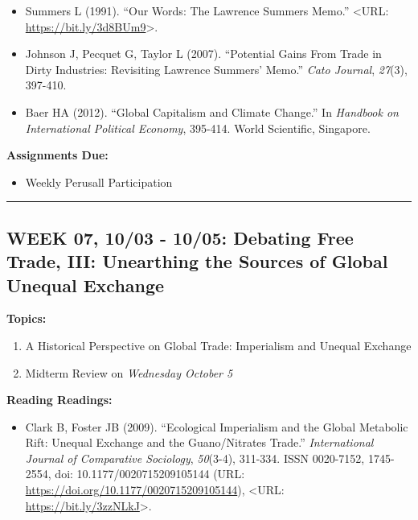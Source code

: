 \documentclass[11pt,]{article}
\providecommand{\tightlist}{%
  \setlength{\itemsep}{0pt}\setlength{\parskip}{0pt}}
\begin{document}
\begin{itemize}
\item
  Summers L (1991). ``Our Words: The Lawrence Summers Memo.''
  \textless URL: \url{https://bit.ly/3d8BUm9}\textgreater.
\item
  Johnson J, Pecquet G, Taylor L (2007). ``Potential Gains From Trade in
  Dirty Industries: Revisiting Lawrence Summers' Memo.'' \emph{Cato
  Journal}, \emph{27}(3), 397-410.
\item
  Baer HA (2012). ``Global Capitalism and Climate Change.'' In
  \emph{Handbook on International Political Economy}, 395-414. World
  Scientific, Singapore.
\end{itemize}

\textbf{Assignments Due:}

\begin{itemize}
\tightlist
\item
  Weekly Perusall Participation
\end{itemize}

\bigbreak
\hrule

\hypertarget{week-07-1003---1005-debating-free-trade-iii-unearthing-the-sources-of-global-unequal-exchange}{%
\subsection{WEEK 07, 10/03 - 10/05: Debating Free Trade, III: Unearthing
the Sources of Global Unequal
Exchange}\label{week-07-1003---1005-debating-free-trade-iii-unearthing-the-sources-of-global-unequal-exchange}}

\textbf{Topics:}

\begin{enumerate}
\def\labelenumi{(\arabic{enumi})}
\tightlist
\item
  A Historical Perspective on Global Trade: Imperialism and Unequal
  Exchange
\item
  Midterm Review on \emph{Wednesday October 5}
\end{enumerate}

\textbf{Reading Readings:}

\begin{itemize}
\tightlist
\item
  Clark B, Foster JB (2009). ``Ecological Imperialism and the Global
  Metabolic Rift: Unequal Exchange and the Guano/Nitrates Trade.''
  \emph{International Journal of Comparative Sociology}, \emph{50}(3-4),
  311-334. ISSN 0020-7152, 1745-2554, doi: 10.1177/0020715209105144
  (URL: \url{https://doi.org/10.1177/0020715209105144}), \textless URL:
  \url{https://bit.ly/3zzNLkJ}\textgreater.
\end{itemize}
\end{document}
